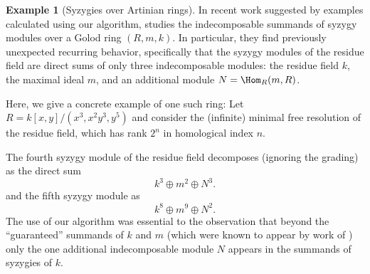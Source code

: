 \documentclass[12pt]{article}
\theoremstyle{theorem}
\numberwithin{thm}{section}
\theoremstyle{definition}
\newtheorem{exa}[thm]{Example}
\newcommand{\mahrud}[1]{{\color{ForestGreen} \sf $\blacklozenge$ Mahrud: [#1]}}
\begin{document}

\begin{exa}[Syzygies over Artinian rings]
  In recent work suggested by examples calculated using our algorithm, \cite{CDE24} studies the indecomposable summands of syzygy modules over a Golod ring $(R,m,k)$. In particular, they find previously unexpected recurring behavior, specifically that the syzygy modules of the residue field are direct sums of only three indecomposable modules: the residue field $k$, the maximal ideal $m$, and an additional module $N = \Hom_R(m, R)$.

  Here, we give a concrete example of one such ring:
  Let $R = k[x,y]/(x^3,x^2y^3,y^5)$ and consider the (infinite) minimal free resolution of the residue field, which has rank $2^n$ in homological index $n$.

  The fourth syzygy module of the residue field decomposes (ignoring the grading) as the direct sum
  $$ k^3 \oplus m^2 \oplus N^3. $$
  and the fifth syzygy module as
  $$ k^8\oplus m^9 \oplus N^2. $$
  The use of our algorithm was essential to the observation that beyond the ``guaranteed'' summands of $k$ and $m$ (which were known to appear by work of \cite{DE23}) only the one additional indecomposable module $N$ appears in the summands of syzygies of $k$.
\end{exa}

\end{document}
